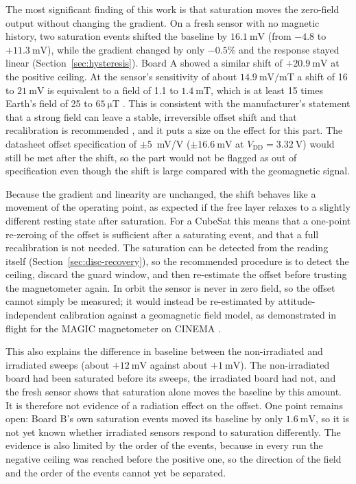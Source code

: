 \documentclass[12pt,a4paper]{article}
\begin{document}
The most significant finding of this work is that saturation moves the zero-field output without changing the gradient. On a fresh sensor with no magnetic history, two saturation events shifted the baseline by $\SI{16.1}{\milli\volt}$ (from $-4.8$ to $+\SI{11.3}{\milli\volt}$), while the gradient changed by only $-0.5\%$ and the response stayed linear (Section~\ref{sec:hysteresis}). Board A showed a similar shift of $+\SI{20.9}{\milli\volt}$ at the positive ceiling. At the sensor's sensitivity of about $\SI{14.9}{\milli\volt\per\milli\tesla}$ a shift of 16 to $\SI{21}{\milli\volt}$ is equivalent to a field of 1.1 to $\SI{1.4}{\milli\tesla}$, which is at least 15 times Earth's field of 25 to $\SI{65}{\micro\tesla}$ \cite{wmm}. This is consistent with the manufacturer's statement that a strong field can leave a stable, irreversible offset shift and that recalibration is recommended \cite{allegro_an133}, and it puts a size on the effect for this part. The datasheet offset specification of $\pm 5$~mV/V ($\pm\SI{16.6}{\milli\volt}$ at $V_{\text{DD}} = \SI{3.32}{\volt}$) \cite{ct100_datasheet} would still be met after the shift, so the part would not be flagged as out of specification even though the shift is large compared with the geomagnetic signal.

Because the gradient and linearity are unchanged, the shift behaves like a movement of the operating point, as expected if the free layer relaxes to a slightly different resting state after saturation. For a CubeSat this means that a one-point re-zeroing of the offset is sufficient after a saturating event, and that a full recalibration is not needed. The saturation can be detected from the reading itself (Section~\ref{sec:disc-recovery}), so the recommended procedure is to detect the ceiling, discard the guard window, and then re-estimate the offset before trusting the magnetometer again. In orbit the sensor is never in zero field, so the offset cannot simply be measured; it would instead be re-estimated by attitude-independent calibration against a geomagnetic field model, as demonstrated in flight for the MAGIC magnetometer on CINEMA \cite{archer2015}.

This also explains the difference in baseline between the non-irradiated and irradiated sweeps (about $+\SI{12}{\milli\volt}$ against about $+\SI{1}{\milli\volt}$). The non-irradiated board had been saturated before its sweeps, the irradiated board had not, and the fresh sensor shows that saturation alone moves the baseline by this amount. It is therefore not evidence of a radiation effect on the offset. One point remains open: Board B's own saturation events moved its baseline by only $\SI{1.6}{\milli\volt}$, so it is not yet known whether irradiated sensors respond to saturation differently. The evidence is also limited by the order of the events, because in every run the negative ceiling was reached before the positive one, so the direction of the field and the order of the events cannot yet be separated.
\end{document}
